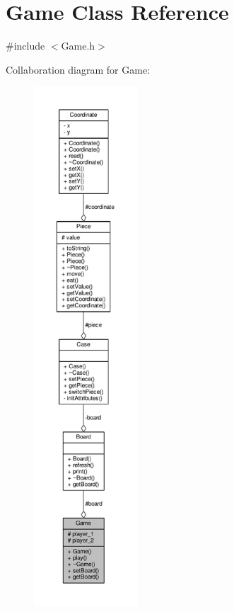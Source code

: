 \hypertarget{class_game}{}\section{Game Class Reference}
\label{class_game}


{\ttfamily \#include $<$Game.\+h$>$}



Collaboration diagram for Game\+:\nopagebreak
\begin{figure}[H]
\begin{center}
\leavevmode
\includegraphics[height=550pt]{class_game__coll__graph}
\end{center}
\end{figure}
